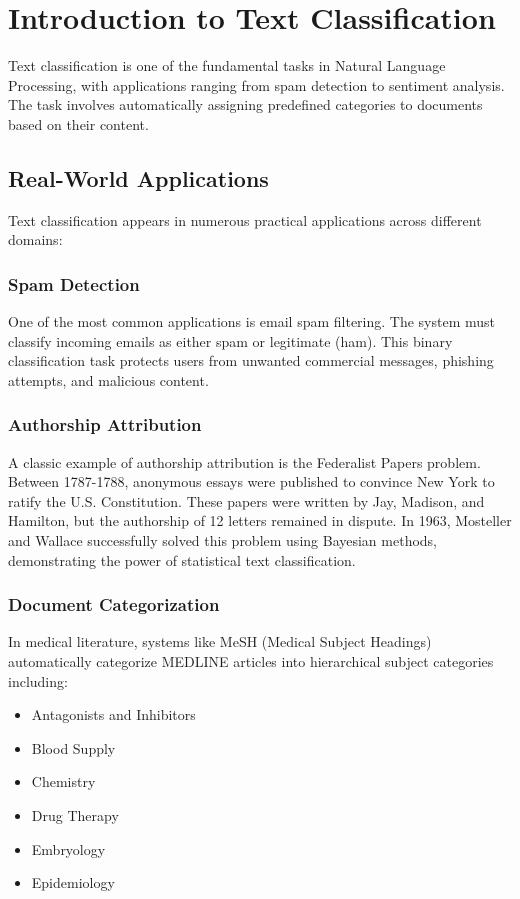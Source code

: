 \documentclass[11pt,a4paper]{article}
\theoremstyle{definition}
\theoremstyle{plain}
\theoremstyle{remark}
\begin{document}
\section{Introduction to Text Classification}

Text classification is one of the fundamental tasks in Natural Language Processing, with applications ranging from spam detection to sentiment analysis. The task involves automatically assigning predefined categories to documents based on their content.

\subsection{Real-World Applications}

Text classification appears in numerous practical applications across different domains:

\subsubsection{Spam Detection}

One of the most common applications is email spam filtering. The system must classify incoming emails as either spam or legitimate (ham). This binary classification task protects users from unwanted commercial messages, phishing attempts, and malicious content.

\subsubsection{Authorship Attribution}

A classic example of authorship attribution is the Federalist Papers problem. Between 1787-1788, anonymous essays were published to convince New York to ratify the U.S. Constitution. These papers were written by Jay, Madison, and Hamilton, but the authorship of 12 letters remained in dispute. In 1963, Mosteller and Wallace successfully solved this problem using Bayesian methods, demonstrating the power of statistical text classification.

\subsubsection{Document Categorization}

In medical literature, systems like MeSH (Medical Subject Headings) automatically categorize MEDLINE articles into hierarchical subject categories including:
\begin{itemize}
    \item Antagonists and Inhibitors
    \item Blood Supply
    \item Chemistry
    \item Drug Therapy
    \item Embryology
    \item Epidemiology
\end{itemize}
\end{document}

